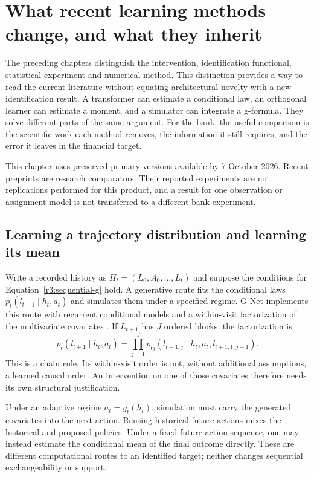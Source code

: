 \chapter{What recent learning methods change, and what they inherit}
\label{r3:recent}

The preceding chapters distinguish the intervention, identification functional,
statistical experiment and numerical method. This distinction provides a way
to read the current literature without equating architectural novelty with a
new identification result. A transformer can estimate a conditional law, an
orthogonal learner can estimate a moment, and a simulator can integrate a
g-formula. They solve different parts of the same argument. For the bank,
the useful comparison is the scientific work each method removes, the
information it still requires, and the error it leaves in the financial target.

This chapter uses preserved primary versions available by 7 October 2026.
Recent preprints are research comparators. Their reported experiments are
not replications performed for this product, and a result for one observation
or assignment model is not transferred to a different bank experiment.

\section{Learning a trajectory distribution and learning its mean}
\label{r3:neural-g}

Write a recorded history as $H_t=(L_0,A_0,\ldots,L_t)$ and suppose the
conditions for Equation~\eqref{r3:sequential-g} hold. A generative route fits
the conditional laws $p_t(l_{t+1}\mid h_t,a_t)$ and simulates them under a
specified regime. G-Net implements this route with recurrent conditional
models and a within-visit factorization of the multivariate covariates
\citep[Sections 3--4 and Algorithm 1]{gnet2020}. If $L_{t+1}$ has $J$
ordered blocks, the factorization is
\[
 p_t(l_{t+1}\mid h_t,a_t)=
 \prod_{j=1}^J p_{tj}(l_{t+1,j}\mid h_t,a_t,l_{t+1,1:j-1}).
\]
This is a chain rule. Its within-visit order is not, without additional
assumptions, a learned causal order. An intervention on one of those
covariates therefore needs its own structural justification.

Under an adaptive regime $a_t=g_t(h_t)$, simulation must carry the generated
covariates into the next action. Reusing historical future actions mixes
the historical and proposed policies. Under a fixed future action sequence,
one may instead estimate the conditional mean of the final outcome directly.
These are different computational routes to an identified target; neither
changes sequential exchangeability or support.

